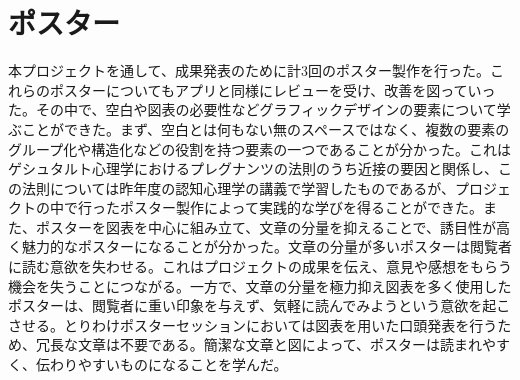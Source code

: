\section{ポスター}
本プロジェクトを通して、成果発表のために計3回のポスター製作を行った。これらのポスターについてもアプリと同様にレビューを受け、改善を図っていった。その中で、空白や図表の必要性などグラフィックデザインの要素について学ぶことができた。まず、空白とは何もない無のスペースではなく、複数の要素のグループ化や構造化などの役割を持つ要素の一つであることが分かった。これはゲシュタルト心理学におけるプレグナンツの法則のうち近接の要因と関係し、この法則については昨年度の認知心理学の講義で学習したものであるが、プロジェクトの中で行ったポスター製作によって実践的な学びを得ることができた。また、ポスターを図表を中心に組み立て、文章の分量を抑えることで、誘目性が高く魅力的なポスターになることが分かった。文章の分量が多いポスターは閲覧者に読む意欲を失わせる。これはプロジェクトの成果を伝え、意見や感想をもらう機会を失うことにつながる。一方で、文章の分量を極力抑え図表を多く使用したポスターは、閲覧者に重い印象を与えず、気軽に読んでみようという意欲を起こさせる。とりわけポスターセッションにおいては図表を用いた口頭発表を行うため、冗長な文章は不要である。簡潔な文章と図によって、ポスターは読まれやすく、伝わりやすいものになることを学んだ。
